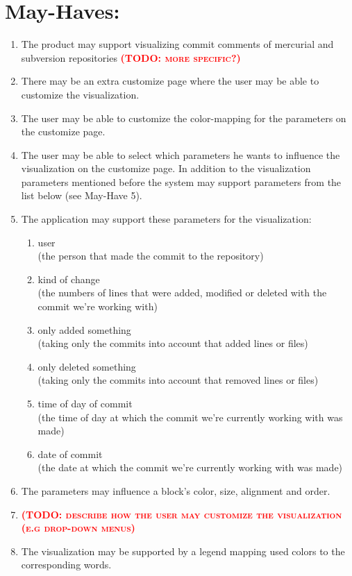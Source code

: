 \documentclass[12pt]{scrartcl}
\newcommand{\todo}[1]{\textbf{\textsc{\textcolor{red}{(TODO: #1)}}}}
\begin{document}
\section{May-Haves:}
\begin{enumerate}
\item The product may support visualizing commit comments of mercurial and subversion repositories \todo{more specific?}
\item There may be an extra customize page where the user may be able to customize the visualization.
\item The user may be able to customize the color-mapping for the parameters on the customize page.
\item The user may be able to select which parameters he wants to influence the visualization on the customize page. In addition to the visualization parameters mentioned before the system may support parameters from the list below (see May-Have 5).
\item The application may support these parameters for the visualization:
\begin{enumerate}
\item user\\
(the person that made the commit to the repository)
\item kind of change\\  
(the numbers of lines that were added, modified or deleted with the commit we're working with)
\item only added something \\
(taking only the commits into account that added lines or files)
\item only deleted something\\
(taking only the commits into account that removed lines or files)
\item time of day of commit\\
(the time of day at which the commit we're currently working with was made)
\item date of commit\\
(the date at which the commit we're currently working with was made)
\end{enumerate}
\item The parameters may influence a block's color, size, alignment and order.
\item \todo{describe how the user may customize the visualization (e.g drop-down menus}
\item The visualization may be supported by a legend mapping used colors to the corresponding words.

\end{enumerate}
\end{document}

